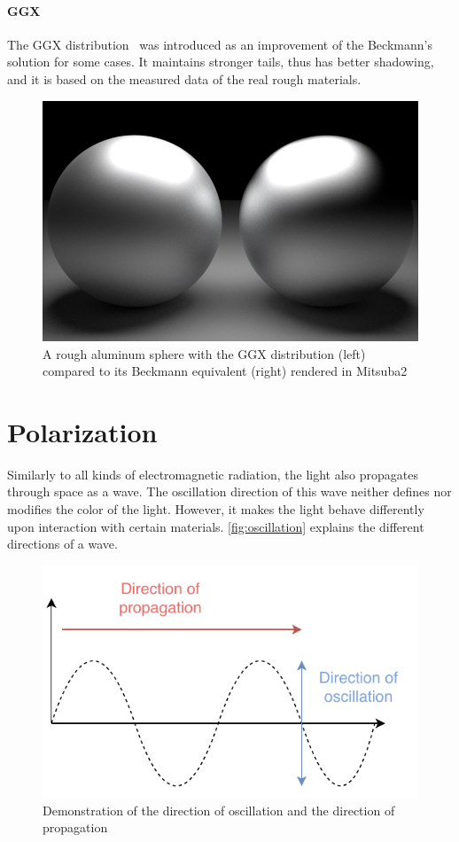 \paragraph{GGX}

The GGX distribution~\cite{walter2007microfacet} was introduced as an improvement of the Beckmann's solution for some cases. It maintains stronger tails, thus has better shadowing, and it is based on the measured data of the real rough materials.

\begin{figure}[h]
	\centering
	\includegraphics[width=.8\linewidth]{img/ggx_beckmann.png}
	\caption{A rough aluminum sphere with the GGX distribution (left) compared to its Beckmann equivalent (right) rendered in Mitsuba2}
	\label{fig:ggx_beckmann}
\end{figure}

\section{Polarization}
\label{sec:polarization}

Similarly to all kinds of electromagnetic radiation, the light also propagates through space as a wave. The oscillation direction of this wave neither defines nor modifies the color of the light. However, it makes the light behave differently upon interaction with certain materials. \autoref{fig:oscillation} explains the different directions of a wave.

\begin{figure}[h]
	\centering
	\includegraphics[width=.6\linewidth]{img/oscillation.pdf}
	\caption{Demonstration of the direction of oscillation and the direction of propagation}
	\label{fig:oscillation}
\end{figure}

